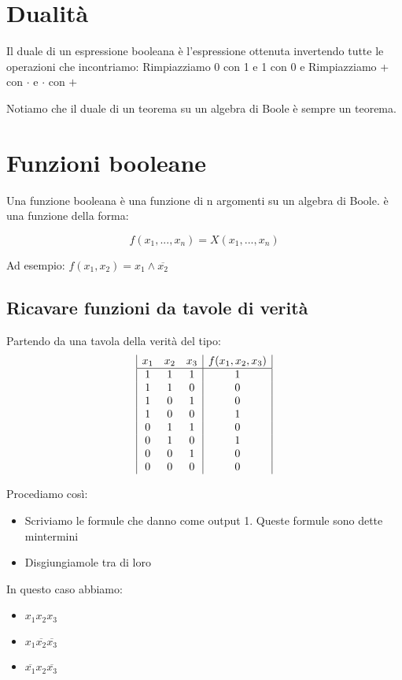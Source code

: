 \documentclass[a4paper]{article}
\begin{document}
\section{Dualità}

Il duale di un espressione booleana è l'espressione ottenuta invertendo tutte le operazioni che incontriamo:
Rimpiazziamo 0 con 1 e 1 con 0 e Rimpiazziamo + con $\cdot$ e $\cdot$ con $+$

Notiamo che il duale di un teorema su un algebra di Boole è sempre un teorema.

\section{Funzioni booleane}

Una funzione booleana è una funzione di n argomenti su un algebra di Boole. è una funzione della forma:

$$f(x_1, ..., x_n) = X(x_1, ..., x_n)$$

Ad esempio: $f(x_1, x_2) = x_1 \land \overline{x_2}$

\subsection{Ricavare funzioni da tavole di verità}

Partendo da una tavola della verità del tipo: 
$$
	\begin{array}{|c c c|c|}
		x_1 & x_2 & x_3 & f(x_1, x_2, x_3)\\
		\hline
		1 & 1 & 1 & 1\\
		1 & 1 & 0 & 0\\
		1 & 0 & 1 & 0\\
		1 & 0 & 0& 1\\
		0 & 1 & 1 & 0\\
		0 & 1 & 0 & 1\\
		0 & 0 & 1 & 0\\
		0 & 0 & 0 & 0\\
	\end{array}
$$

Procediamo così:

\begin{itemize}
	\item Scriviamo le formule che danno come output 1. Queste formule sono dette mintermini
	\item Disgiungiamole tra di loro
\end{itemize}

In questo caso abbiamo:
\begin{itemize}
	\item $x_1 x_2 x_3$
	\item $x_1 \overline{x_2} \overline{x_3}$
	\item $\overline{x_1} x_2 \overline{x_3}$
\end{itemize}
\end{document}
